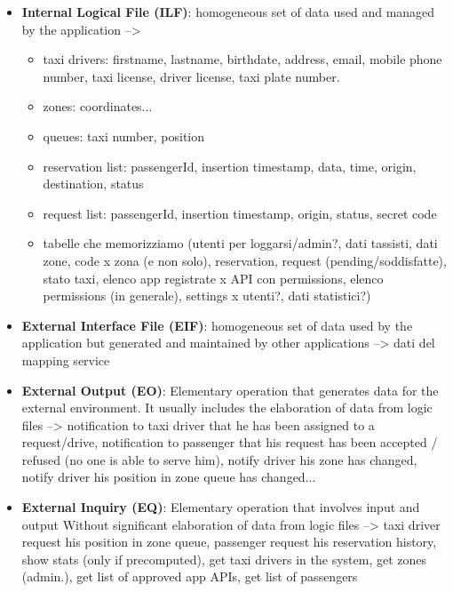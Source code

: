 \begin{itemize}
\item \textbf{Internal Logical File (ILF)}:
homogeneous set of data used and managed by the application --> 
\begin{itemize}
\item taxi drivers: firstname, lastname, birthdate, address, email, mobile phone number, taxi license, driver license, taxi plate number.
\item zones: coordinates...
\item queues: taxi number, position
\item reservation list: passengerId, insertion timestamp, data, time, origin, destination, status
\item request list: passengerId, insertion timestamp, origin, status, secret code
\item 
tabelle che memorizziamo (utenti per loggarsi/admin?, dati tassisti, dati zone, code x zona (e non solo), reservation, request (pending/soddisfatte), stato taxi, elenco app registrate x API con permissions, elenco permissions (in generale), settings x utenti?, dati statistici?) 
\end{itemize}

\item \textbf{External Interface File (EIF)}: homogeneous set of data used by the application but generated and maintained by other applications --> 
dati del mapping service


\item \textbf{External Output (EO)}:
Elementary operation that generates data for the external environment. It usually includes the elaboration of data from logic files -->
notification to taxi driver that he has been assigned to a request/drive, notification to passenger that his request has been accepted / refused (no one is able to serve him), notify driver his zone has changed, notify driver his position in zone queue has changed... 

\item \textbf{External Inquiry (EQ)}:
Elementary operation that involves input and output Without significant elaboration of data from logic files -->
taxi driver request his position in zone queue, passenger request his reservation history, show stats (only if precomputed), get taxi drivers in the system, get zones (admin.), get list of approved app APIs, get list of passengers

\end{itemize}
